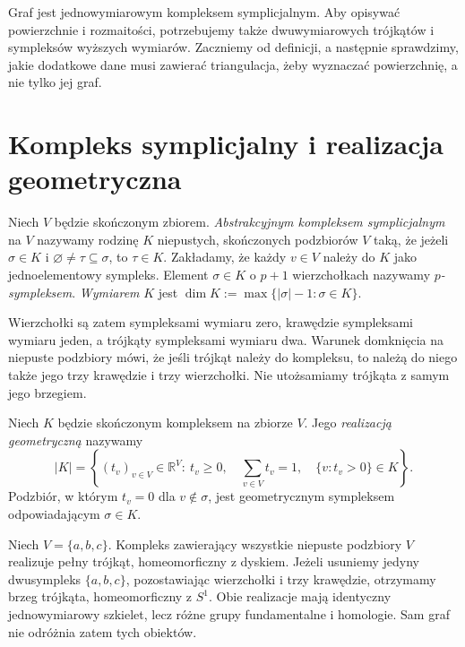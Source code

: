 Graf jest jednowymiarowym kompleksem symplicjalnym. Aby opisywać
powierzchnie i rozmaitości, potrzebujemy także dwuwymiarowych
trójkątów i sympleksów wyższych wymiarów. Zaczniemy od definicji,
a następnie sprawdzimy, jakie dodatkowe dane musi zawierać
triangulacja, żeby wyznaczać powierzchnię, a nie tylko jej graf.

\section{Kompleks symplicjalny i realizacja geometryczna}
\label{sec:tg-kompleks-symplicjalny}

\begin{definicja}
Niech $V$ będzie skończonym zbiorem. \emph{Abstrakcyjnym
kompleksem symplicjalnym} na $V$ nazywamy rodzinę $K$
niepustych, skończonych podzbiorów $V$ taką, że jeżeli
$\sigma\in K$ i $\varnothing\ne\tau\subseteq\sigma$,
to $\tau\in K$. Zakładamy, że każdy $v\in V$ należy do $K$
jako jednoelementowy sympleks. Element $\sigma\in K$
o $p+1$ wierzchołkach nazywamy \emph{$p$-sympleksem}.
\emph{Wymiarem} $K$ jest
$\dim K:=\max\{|\sigma|-1:\sigma\in K\}$.
\end{definicja}

Wierzchołki są zatem sympleksami wymiaru zero, krawędzie
sympleksami wymiaru jeden, a trójkąty sympleksami wymiaru dwa.
Warunek domknięcia na niepuste podzbiory mówi, że jeśli
trójkąt należy do kompleksu, to należą do niego także jego
trzy krawędzie i trzy wierzchołki. Nie utożsamiamy
trójkąta z samym jego brzegiem.

\begin{definicja}
Niech $K$ będzie skończonym kompleksem na zbiorze $V$.
Jego \emph{realizacją geometryczną} nazywamy
\[
|K|=\left\{(t_v)_{v\in V}\in\mathbb R^V:\
t_v\ge0,\quad\sum_{v\in V}t_v=1,\quad
\{v:t_v>0\}\in K\right\}.
\]
Podzbiór, w którym $t_v=0$ dla $v\notin\sigma$, jest
geometrycznym sympleksem odpowiadającym $\sigma\in K$.
\end{definicja}

\begin{przyklad}
Niech $V=\{a,b,c\}$. Kompleks zawierający wszystkie niepuste
podzbiory $V$ realizuje pełny trójkąt, homeomorficzny z dyskiem.
Jeżeli usuniemy jedyny dwusympleks $\{a,b,c\}$, pozostawiając
wierzchołki i trzy krawędzie, otrzymamy brzeg trójkąta,
homeomorficzny z $S^1$. Obie realizacje mają identyczny
jednowymiarowy szkielet, lecz różne grupy fundamentalne
i homologie. Sam graf nie odróżnia zatem tych obiektów.
\end{przyklad}

